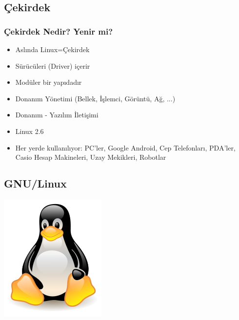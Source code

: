 \documentclass{beamer}
\begin{document}
	\subsection{Çekirdek}
		\begin{frame}
		 	\frametitle{Çekirdek Nedir? Yenir mi?}
			\begin{itemize}[<+->]
			 \item Aslında Linux=Çekirdek
			 \item Sürücüleri (Driver)  içerir
			 \item Modüler bir yapıdadır
			 \item Donanım Yönetimi (Bellek, İşlemci, Görüntü, Ağ, ...)
			 \item Donanım - Yazılım İletişimi			 
			 \item Linux 2.6
			 \item Her yerde kullanılıyor: PC'ler, Google Android, Cep Telefonları, PDA'ler, Casio Hesap Makineleri, Uzay Mekikleri, Robotlar
			 

			\end{itemize}
			
		\end{frame}

	\subsection{GNU/Linux}
		\begin{frame}
		\begin{center}
 		 \includegraphics{linux.png}
		\end{center}
		\end{frame}
\end{document}
